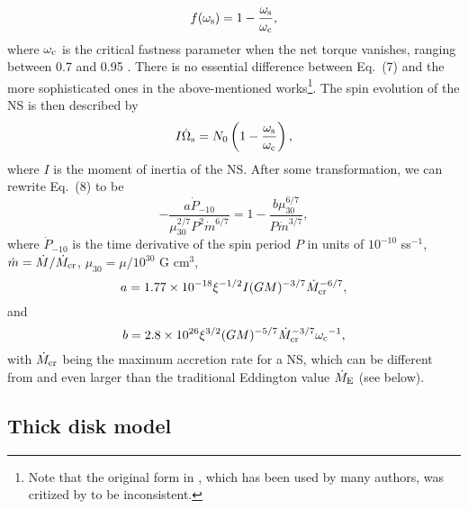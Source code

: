 \documentclass[12pt,preprint]{aastex}
\begin{document}
\begin{equation}
f(\omega_{\rm s})=1-\frac{\omega_{\rm s}}{\omega_{\rm c}},
\end{equation}
where $\omega_{\rm c}$ is the critical fastness parameter when the net torque vanishes, ranging between 0.7 and 0.95 \citep{w1995,lw1996}. There is no essential difference between Eq.~(7) and the more sophisticated ones in the above-mentioned works\footnote{Note that the original form in \cite{gl1979}, which has been used by many authors, was critized by \citet{w1987} to be inconsistent.}. The spin evolution of the NS is then described by
\begin{equation}
I\dot{\Omega}_{\rm s}=N_0\left(1-\frac{\omega_{\rm s}}{\omega_{\rm c}}\right),
\end{equation}
where $I$ is the moment of inertia of the NS. After some transformation, we can rewrite Eq.~(8) to be
\begin{equation}
-\frac{a \dot{P}_{-10}}{\mu_{30}^{2/7}P^2\dot{m}^{6/7}}
=1-\frac{b\mu_{30}^{6/7}}{P\dot{m}^{3/7}},
\end{equation}
where $\dot{P}_{-10}$ is the time derivative of the spin period $P$ in units of $10^{-10}$ ss$^{-1}$, $\dot{m}=\dot{M}/\dot{M}_{\rm cr}$, $\mu_{30}=\mu/10^{30}$ G cm$^3$,
\begin{equation}
a=1.77\times 10^{-18} \xi^{-1/2}I(GM)^{-3/7}\dot{M}_{\rm cr}^{-6/7},
\end{equation}
and
\begin{equation}
b=2.8\times 10^{26}\xi^{3/2}(GM)^{-5/7}\dot{M}_{\rm cr}^{-3/7}{\omega_{\rm c}}^{-1},
\end{equation}
with $\dot{M}_{\rm cr}$ being the maximum accretion rate for a NS, which can be different from and even larger than the traditional Eddington value $\dot{M}_{\rm E}$ (see below).


\subsection{Thick disk model}
\end{document}
